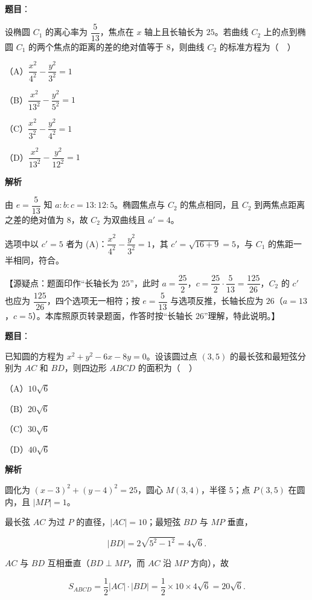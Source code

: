 \begin{answer}

\textbf{题目}：

设椭圆 $C_1$ 的离心率为 $\dfrac5{13}$，焦点在 $x$ 轴上且长轴长为 $25$。若曲线 $C_2$ 上的点到椭圆 $C_1$ 的两个焦点的距离的差的绝对值等于 $8$，则曲线 $C_2$ 的标准方程为（　）

（A）$\dfrac{x^2}{4^2}-\dfrac{y^2}{3^2}=1$

（B）$\dfrac{x^2}{13^2}-\dfrac{y^2}{5^2}=1$

（C）$\dfrac{x^2}{3^2}-\dfrac{y^2}{4^2}=1$

（D）$\dfrac{x^2}{13^2}-\dfrac{y^2}{12^2}=1$

\textbf{解析}

由 $e=\dfrac5{13}$ 知 $a:b:c=13:12:5$。椭圆焦点与 $C_2$ 的焦点相同，且 $C_2$ 到两焦点距离之差的绝对值为 $8$，故 $C_2$ 为双曲线且 $a'=4$。

选项中以 $c'=5$ 者为 (A)：$\dfrac{x^2}{4^2}-\dfrac{y^2}{3^2}=1$，其 $c'=\sqrt{16+9}=5$，与 $C_1$ 的焦距一半相同，符合。

【源疑点：题面印作“长轴长为 $25$”，此时 $a=\dfrac{25}2$，$c=\dfrac{25}2\cdot\dfrac5{13}=\dfrac{125}{26}$，$C_2$ 的 $c'$ 也应为 $\dfrac{125}{26}$，四个选项无一相符；按 $e=\dfrac5{13}$ 与选项反推，长轴长应为 $26$（$a=13$，$c=5$）。本库照原页转录题面，作答时按“长轴长 $26$”理解，特此说明。】


\end{answer}
\begin{answer}

\textbf{题目}：

已知圆的方程为 $x^2+y^2-6x-8y=0$。设该圆过点 $(3,5)$ 的最长弦和最短弦分别为 $AC$ 和 $BD$，则四边形 $ABCD$ 的面积为（　）

（A）$10\sqrt6$

（B）$20\sqrt6$

（C）$30\sqrt6$

（D）$40\sqrt6$

\textbf{解析}

圆化为 $(x-3)^2+(y-4)^2=25$，圆心 $M(3,4)$，半径 $5$；点 $P(3,5)$ 在圆内，且 $|MP|=1$。

最长弦 $AC$ 为过 $P$ 的直径，$|AC|=10$；最短弦 $BD$ 与 $MP$ 垂直，

\nopagebreak[4]
\[|BD|=2\sqrt{5^2-1^2}=4\sqrt6.\]

$AC$ 与 $BD$ 互相垂直（$BD\perp MP$，而 $AC$ 沿 $MP$ 方向），故

\nopagebreak[4]
\[S_{ABCD}=\frac12|AC|\cdot|BD|=\frac12\times10\times4\sqrt6=20\sqrt6.\]


\end{answer}
